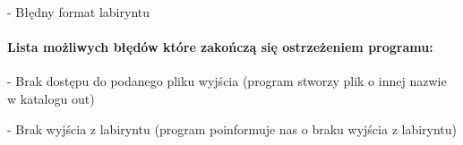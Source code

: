 \documentclass[
]{article}
\begin{document}
- Błędny format labiryntu

\hypertarget{lista-moux17cliwych-bux142ux119duxf3w-ktuxf3re-zakoux144czux105-siux119-ostrzeux17ceniem-programu}{%
\paragraph{Lista możliwych błędów które zakończą się ostrzeżeniem
programu:}\label{lista-moux17cliwych-bux142ux119duxf3w-ktuxf3re-zakoux144czux105-siux119-ostrzeux17ceniem-programu}}

- Brak dostępu do podanego pliku wyjścia (program stworzy plik o innej
nazwie w katalogu out)

- Brak wyjścia z labiryntu (program poinformuje nas o braku wyjścia z
labiryntu)
\end{document}
